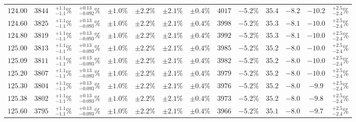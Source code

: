 \begin{landscape}
\begin{table}[ht!]
{\begin{tabular}{| cc | ccc | ccc | ccc | cc | c |}
$124.00$ & $3844$ & $^{+1.1}_{-1.1}\%$ & {\color{black!55}$^{+0.13}_{-0.092}\%$} & {\color{black!55}$\pm 1.0\%$} & $\pm 2.2\%$ & {\color{black!55}$\pm 2.1\%$} & {\color{black!55}$\pm 0.4\%$} & $4017$ & $-5.2\%$ & $35.4$ & $-8.2$ & $-10.2$ & $^{+2.5}_{-2.4}\%$ \\
$124.60$ & $3825$ & $^{+1.1}_{-1.1}\%$ & {\color{black!55}$^{+0.13}_{-0.093}\%$} & {\color{black!55}$\pm 1.0\%$} & $\pm 2.2\%$ & {\color{black!55}$\pm 2.1\%$} & {\color{black!55}$\pm 0.4\%$} & $3998$ & $-5.2\%$ & $35.3$ & $-8.1$ & $-10.0$ & $^{+2.5}_{-2.4}\%$ \\
$124.80$ & $3819$ & $^{+1.1}_{-1.1}\%$ & {\color{black!55}$^{+0.13}_{-0.093}\%$} & {\color{black!55}$\pm 1.0\%$} & $\pm 2.2\%$ & {\color{black!55}$\pm 2.1\%$} & {\color{black!55}$\pm 0.4\%$} & $3992$ & $-5.2\%$ & $35.3$ & $-8.1$ & $-10.0$ & $^{+2.5}_{-2.4}\%$ \\
$125.00$ & $3813$ & $^{+1.1}_{-1.1}\%$ & {\color{black!55}$^{+0.13}_{-0.093}\%$} & {\color{black!55}$\pm 1.0\%$} & $\pm 2.2\%$ & {\color{black!55}$\pm 2.1\%$} & {\color{black!55}$\pm 0.4\%$} & $3985$ & $-5.2\%$ & $35.2$ & $-8.0$ & $-10.0$ & $^{+2.5}_{-2.4}\%$ \\
$125.09$ & $3811$ & $^{+1.1}_{-1.1}\%$ & {\color{black!55}$^{+0.13}_{-0.093}\%$} & {\color{black!55}$\pm 1.0\%$} & $\pm 2.2\%$ & {\color{black!55}$\pm 2.1\%$} & {\color{black!55}$\pm 0.4\%$} & $3982$ & $-5.2\%$ & $35.2$ & $-8.0$ & $-10.0$ & $^{+2.5}_{-2.4}\%$ \\
$125.20$ & $3807$ & $^{+1.1}_{-1.1}\%$ & {\color{black!55}$^{+0.13}_{-0.093}\%$} & {\color{black!55}$\pm 1.0\%$} & $\pm 2.2\%$ & {\color{black!55}$\pm 2.1\%$} & {\color{black!55}$\pm 0.4\%$} & $3979$ & $-5.2\%$ & $35.2$ & $-8.0$ & $-10.0$ & $^{+2.5}_{-2.4}\%$ \\
$125.30$ & $3804$ & $^{+1.1}_{-1.1}\%$ & {\color{black!55}$^{+0.13}_{-0.093}\%$} & {\color{black!55}$\pm 1.0\%$} & $\pm 2.2\%$ & {\color{black!55}$\pm 2.1\%$} & {\color{black!55}$\pm 0.4\%$} & $3976$ & $-5.2\%$ & $35.2$ & $-8.0$ & $-9.9$ & $^{+2.5}_{-2.4}\%$ \\
$125.38$ & $3802$ & $^{+1.1}_{-1.1}\%$ & {\color{black!55}$^{+0.13}_{-0.093}\%$} & {\color{black!55}$\pm 1.0\%$} & $\pm 2.2\%$ & {\color{black!55}$\pm 2.1\%$} & {\color{black!55}$\pm 0.4\%$} & $3973$ & $-5.2\%$ & $35.2$ & $-8.0$ & $-9.8$ & $^{+2.5}_{-2.4}\%$ \\
$125.60$ & $3795$ & $^{+1.1}_{-1.1}\%$ & {\color{black!55}$^{+0.13}_{-0.093}\%$} & {\color{black!55}$\pm 1.0\%$} & $\pm 2.2\%$ & {\color{black!55}$\pm 2.1\%$} & {\color{black!55}$\pm 0.4\%$} & $3966$ & $-5.2\%$ & $35.1$ & $-8.0$ & $-9.7$ & $^{+2.5}_{-2.4}\%$ \\

\end{tabular}}
\end{table}
\end{landscape}

